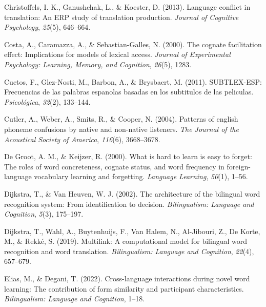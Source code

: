 \documentclass[
  english,
  man,floatsintext]{apa7}
\newlength{\cslhangindent}
\newenvironment{CSLReferences}[2] %
 {%
  \setlength{\parindent}{0pt}
  \ifodd #1 \everypar{\setlength{\hangindent}{\cslhangindent}}\ignorespaces\fi
  \ifnum #2 > 0
  \setlength{\parskip}{#2\baselineskip}
  \fi
 }%
 {}
\begin{document}
\begin{CSLReferences}{1}{0}
\leavevmode{}%
Christoffels, I. K., Ganushchak, L., \& Koester, D. (2013). Language conflict in translation: An ERP study of translation production. \emph{Journal of Cognitive Psychology}, \emph{25}(5), 646--664.

\leavevmode{}%
Costa, A., Caramazza, A., \& Sebastian-Galles, N. (2000). The cognate facilitation effect: Implications for models of lexical access. \emph{Journal of Experimental Psychology: Learning, Memory, and Cognition}, \emph{26}(5), 1283.

\leavevmode{}%
Cuetos, F., Glez-Nosti, M., Barbon, A., \& Brysbaert, M. (2011). SUBTLEX-ESP: Frecuencias de las palabras espanolas basadas en los subtitulos de las peliculas. \emph{Psicol{ó}gica}, \emph{32}(2), 133--144.

\leavevmode{}%
Cutler, A., Weber, A., Smits, R., \& Cooper, N. (2004). Patterns of english phoneme confusions by native and non-native listeners. \emph{The Journal of the Acoustical Society of America}, \emph{116}(6), 3668--3678.

\leavevmode{}%
De Groot, A. M., \& Keijzer, R. (2000). What is hard to learn is easy to forget: The roles of word concreteness, cognate status, and word frequency in foreign-language vocabulary learning and forgetting. \emph{Language Learning}, \emph{50}(1), 1--56.

\leavevmode{}%
Dijkstra, T., \& Van Heuven, W. J. (2002). The architecture of the bilingual word recognition system: From identification to decision. \emph{Bilingualism: Language and Cognition}, \emph{5}(3), 175--197.

\leavevmode{}%
Dijkstra, T., Wahl, A., Buytenhuijs, F., Van Halem, N., Al-Jibouri, Z., De Korte, M., \& Rekké, S. (2019). Multilink: A computational model for bilingual word recognition and word translation. \emph{Bilingualism: Language and Cognition}, \emph{22}(4), 657--679.

\leavevmode{}%
Elias, M., \& Degani, T. (2022). Cross-language interactions during novel word learning: The contribution of form similarity and participant characteristics. \emph{Bilingualism: Language and Cognition}, 1--18.


\end{CSLReferences}
\end{document}
